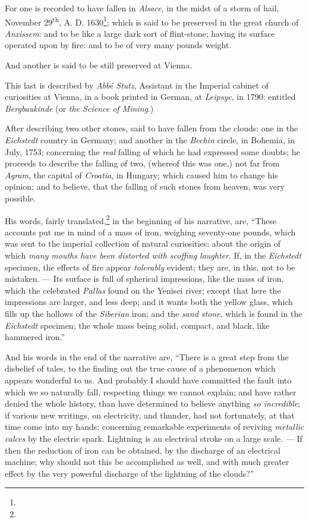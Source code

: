 \documentclass[a4paper, 12pt, oneside, twocolumn]{article}
\begin{document}
For one is recorded to have fallen in \emph{Alsace}, in the midst of a storm of hail, November 29\textsuperscript{th}, A. D. 1630\footnote{}; which is said to be preserved in the great church of \emph{Anxissem}: and to be like a large dark sort of flint-stone; having its surface operated upon by fire: and to be of very many pounds weight.

And another is said to be still preserved at Vienna.

This last is described by \emph{Abbé Stutz}, Assistant in the Imperial cabinet of curiosities at Vienna, in a book printed in German, at \emph{Leipsyc}, in 1790: entitled \emph{Bergbaukinde} (or \emph{the Science of Mining}.)

After describing two other stones, said to have fallen from the clouds: one in the \emph{Eichstedt} country in Germany; and another in the \emph{Bechin} circle, in Bohemia, in July, 1753; concerning the \emph{real} falling of which he had expressed some doubts; he proceeds to describe the falling of two, (whereof this was one,) not far from \emph{Agram}, the capital of \emph{Croatia}, in Hungary; which caused him to change his opinion; and to believe, that the falling of such stones from heaven, was very possible.

His words, fairly translated,\footnote{} in the beginning of his narrative, are, ``These accounts put me in mind of a mass of iron, weighing seventy-one pounds, which was sent to the imperial collection of natural curiosities: about the origin of which \emph{many mouths have been distorted with scoffing laughter}. If, in the \emph{Eichstedt} specimen, the effects of fire appear \emph{tolerably} evident; they are, in this, not to be mistaken. --- Its surface is full of spherical impressions, like the mass of iron, which the celebrated \emph{Pallas} found on the Yenisei river; except that here the impressions are larger, and less deep; and it wants both the yellow glass, which fills up the hollows of the \emph{Siberian} iron; and the \emph{sand stone}, which is found in the \emph{Eichstedt} specimen; the whole mass being solid, compact, and black, like hammered iron.''

And his words in the end of the narrative are, ``There is a great step from the disbelief of tales, to the finding out the true cause of a phenomenon which appears wonderful to us. And probably I should have committed the fault into which we so naturally fall, respecting things we cannot explain; and have rather denied the whole history, than have determined to believe anything \emph{so incredible}; if various new writings, on electricity, and thunder, had not fortunately, at that time come into my hands; concerning remarkable experiments of reviving \emph{metallic calces} by the electric spark. Lightning is an electrical stroke on a large scale. --- If then the reduction of iron can be obtained, by the discharge of an electrical machine; why should not this be accomplished as well, and with much greater effect by the very powerful discharge of the lightning of the clouds?''
\end{document}
